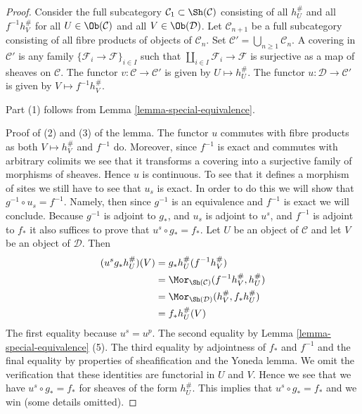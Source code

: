 \begin{proof}
Consider the full subcategory
$\mathcal{C}_1 \subset \Sh(\mathcal{C})$ consisting of all
$h_U^\#$ and all $f^{-1}h_V^\#$ for all
$U \in \Ob(\mathcal{C})$ and all $V \in \Ob(\mathcal{D})$.
Let $\mathcal{C}_{n + 1}$ be a full subcategory consisting of all
fibre products of objects of $\mathcal{C}_n$. Set
$\mathcal{C}' = \bigcup_{n \geq 1} \mathcal{C}_n$.
A covering in $\mathcal{C}'$ is any family
$\{\mathcal{F}_i \to \mathcal{F}\}_{i \in I}$ such that
$\coprod_{i \in I} \mathcal{F}_i \to \mathcal{F}$ is surjective
as a map of sheaves on $\mathcal{C}$.
The functor $v : \mathcal{C} \to \mathcal{C'}$ is given by
$U \mapsto h_U^\#$.
The functor $u : \mathcal{D} \to \mathcal{C'}$ is given by
$V \mapsto f^{-1}h_V^\#$.

\medskip\noindent
Part (1) follows from Lemma \ref{lemma-special-equivalence}.

\medskip\noindent
Proof of (2) and (3) of the lemma. The functor $u$ commutes with fibre
products as both $V \mapsto h_V^\#$ and $f^{-1}$ do. Moreover,
since $f^{-1}$ is exact and commutes with arbitrary colimits we see
that it transforms a covering into a surjective family of morphisms of
sheaves. Hence $u$ is continuous. To see that it defines a morphism of
sites we still have to see that $u_s$ is exact. In order to do this
we will show that $g^{-1} \circ u_s = f^{-1}$. Namely, then since $g^{-1}$
is an equivalence and $f^{-1}$ is exact we will conclude.
Because $g^{-1}$ is adjoint to $g_*$, and $u_s$ is adjoint to
$u^s$, and $f^{-1}$ is adjoint to $f_*$ it also suffices to prove that
$u^s \circ g_* = f_*$.
Let $U$ be an object of $\mathcal{C}$ and let
$V$ be an object of $\mathcal{D}$. Then
\begin{align*}
(u^sg_*h_U^\#)(V)
& =
g_*h_U^\#(f^{-1}h_V^\#) \\
& =
\Mor_{\Sh(\mathcal{C})}(f^{-1}h_V^\#, h_U^\#) \\
& =
\Mor_{\Sh(\mathcal{D})}(h_V^\#, f_*h_U^\#) \\
& = f_*h_U^\#(V)
\end{align*}
The first equality because $u^s = u^p$. The second equality
by Lemma \ref{lemma-special-equivalence} (5). The third equality
by adjointness of $f_*$ and $f^{-1}$ and the final equality by
properties of sheafification and the Yoneda lemma.
We omit the verification that these identities are functorial in $U$
and $V$. Hence we see that
we have $u^s \circ g_* = f_*$ for sheaves of the form $h_U^\#$.
This implies that $u^s \circ g_* = f_*$ and we win (some details omitted).
\end{proof}

